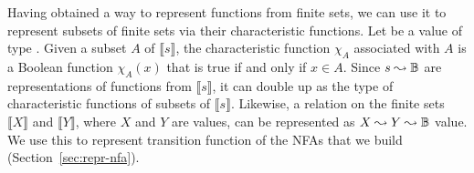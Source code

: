 Having obtained a way to represent functions from finite sets,
we can use it to represent subsets of finite sets via their
characteristic functions.
%
Let  be a value of type .
Given a subset $A$ of $⟦s⟧$, the characteristic function $\chi_A$
associated with $A$ is a Boolean function $\chi_A(x)$ that is true
if and only if $x ∈ A$.
%
Since $s \mathrel{\leadsto} \mathbb{B}$ are representations of functions from $⟦s⟧$,
it can double up as the type of characteristic functions of subsets of
$⟦s⟧$.
%
%
Likewise, a relation on the finite sets $⟦X⟧$ and $⟦Y⟧$, where $X$ and
$Y$ are  values, can be represented as $X \mathrel{\leadsto} Y \mathrel{\leadsto}
\mathbb{B}$ value.
We use this to represent transition function of the \glspl{NFA} that
we build (Section~\ref{sec:repr-nfa}).


